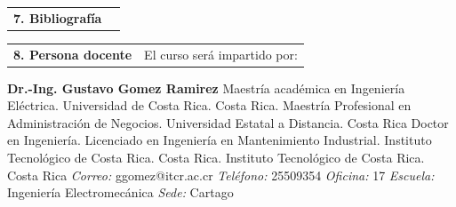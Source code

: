 \documentclass[letterpaper]{article}%
\newenvironment{textoMargen}
    {%
    \begin{list}{}{%
        \setlength{\leftmargin}{3.6cm}%
        \setlength{\rightmargin}{1.1cm}%
    }%
    \item[]%
  }
  {%
    \end{list}%
  }
\begin{document}
\vspace*{4mm}%
\newline%
\begin{tabularx}{\textwidth}{p{3cm}p{13cm}}%
\par\fontsize{12}{14}\selectfont \textbf{\textcolor{parte}{7. Bibliografía}}&\nocite{grainger1996} \nocite{kothari2008} \nocite{wildi2007} \nocite{kersting2012} \nocite{short2014} \nocite{gonen2008} \nocite{momoh2012} \nocite{ekanayake2012} \nocite{pinheiro2018} \nocite{migliavacca2020} \\%
\end{tabularx}%
\vspace*{-8mm}\printbibliography[heading=none]%
\begin{tabularx}{\textwidth}{p{3cm}p{13cm}}%
\par\fontsize{12}{14}\selectfont \textbf{\textcolor{parte}{8. Persona docente}}&El curso será impartido por:\\%
\end{tabularx}%
\vspace*{-4mm}\begin{textoMargen}\textbf{Dr.{-}Ing. Gustavo Gomez Ramirez} \newline Maestría académica en Ingeniería Eléctrica. Universidad de Costa Rica. Costa Rica. \newline \newline  Maestría Profesional en Administración de Negocios. Universidad Estatal a Distancia. Costa Rica \newline \newline  Doctor en Ingeniería. Licenciado en Ingeniería en Mantenimiento Industrial. Instituto Tecnológico de Costa Rica. Costa Rica. Instituto Tecnológico de Costa Rica. Costa Rica \newline \newline \emph{Correo:} ggomez@itcr.ac.cr\emph{  Teléfono:} 25509354 \vspace*{1mm} \newline \emph{  Oficina:} 17\emph{  Escuela:} Ingeniería Electromecánica\emph{  Sede:} Cartago \vspace*{4mm} \newline \end{textoMargen}%
\end{document}
